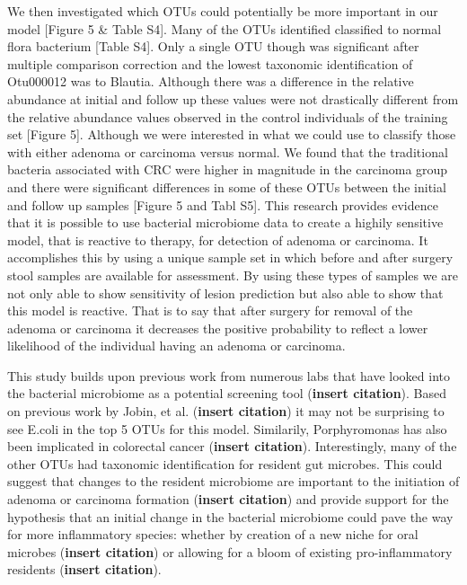 \documentclass[12pt,]{article}
\begin{document}
We then investigated which OTUs could potentially be more important in
our model {[}Figure 5 \& Table S4{]}. Many of the OTUs identified
classified to normal flora bacterium {[}Table S4{]}. Only a single OTU
though was significant after multiple comparison correction and the
lowest taxonomic identification of Otu000012 was to Blautia. Although
there was a difference in the relative abundance at initial and follow
up these values were not drastically different from the relative
abundance values observed in the control individuals of the training set
{[}Figure 5{]}. Although we were interested in what we could use to
classify those with either adenoma or carcinoma versus normal. We found
that the traditional bacteria associated with CRC were higher in
magnitude in the carcinoma group and there were significant differences
in some of these OTUs between the initial and follow up samples
{[}Figure 5 and Tabl S5{]}. This research provides evidence that it is
possible to use bacterial microbiome data to create a highily sensitive
model, that is reactive to therapy, for detection of adenoma or
carcinoma. It accomplishes this by using a unique sample set in which
before and after surgery stool samples are available for assessment. By
using these types of samples we are not only able to show sensitivity of
lesion prediction but also able to show that this model is reactive.
That is to say that after surgery for removal of the adenoma or
carcinoma it decreases the positive probability to reflect a lower
likelihood of the individual having an adenoma or carcinoma.

This study builds upon previous work from numerous labs that have looked
into the bacterial microbiome as a potential screening tool
(\textbf{insert citation}). Based on previous work by Jobin, et al.
(\textbf{insert citation}) it may not be surprising to see E.coli in the
top 5 OTUs for this model. Similarily, Porphyromonas has also been
implicated in colorectal cancer (\textbf{insert citation}).
Interestingly, many of the other OTUs had taxonomic identification for
resident gut microbes. This could suggest that changes to the resident
microbiome are important to the initiation of adenoma or carcinoma
formation (\textbf{insert citation}) and provide support for the
hypothesis that an initial change in the bacterial microbiome could pave
the way for more inflammatory species: whether by creation of a new
niche for oral microbes (\textbf{insert citation}) or allowing for a
bloom of existing pro-inflammatory residents (\textbf{insert citation}).
\end{document}

